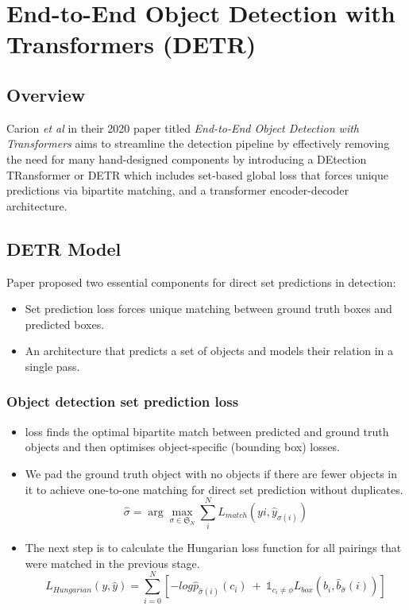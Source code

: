 \section{End-to-End Object Detection with Transformers (DETR)}

\label{appendix:detr-paper}

\subsection{Overview}

\par Carion \textit{et al} in their 2020 paper titled \textit{End-to-End Object Detection with Transformers} aims to streamline the detection pipeline by effectively removing the need for many hand-designed components by introducing a DEtection TRansformer or DETR which includes set-based global loss that forces unique predictions via bipartite matching, and a transformer encoder-decoder architecture.\par

\subsection{DETR Model}
\par Paper proposed two essential components for direct set predictions in detection: \par
\begin{itemize}
	\item Set prediction loss forces unique matching between ground truth boxes and predicted boxes.
	\item An architecture that predicts a set of objects and models their relation in a single pass.
\end{itemize}

\subsubsection{Object detection set prediction loss}
\begin{itemize}
	\item loss finds the optimal bipartite match between predicted and ground truth objects and then optimises object-specific (bounding box) losses. 
	\item We pad the ground truth object with no objects if there are fewer objects in it to achieve one-to-one matching for direct set prediction without duplicates.
	$$\hat{\sigma} = \arg \max_{\sigma \in \mathfrak{S}_N} \displaystyle\sum\limits_{i}^N L_{match}(yi, \hat{y}_{\sigma(i)})$$
	
	\item The next step is to calculate the Hungarian loss function for all pairings that were matched in the previous stage.
	$$L_{Hungarian}(y, \hat{y}) = \displaystyle\sum\limits_{i=0}^N [-log\hat{p}_{\hat{\sigma} (i)}(c_i)\:+\:\mathbb{1}_{c_i\neq\phi}L_{box}(b_i, \hat{b}_{\hat{\sigma}}(i))]$$
\end{itemize}


